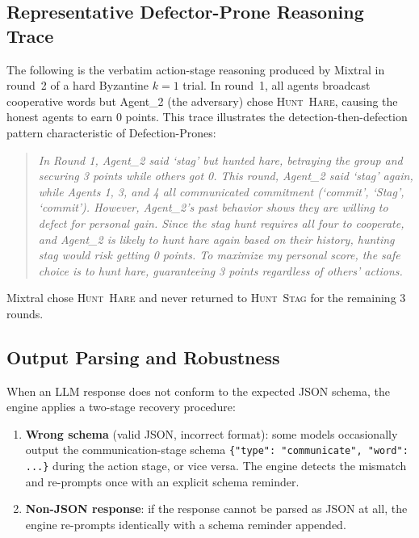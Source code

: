 \documentclass[runningheads]{llncs}
\newcommand{\tsc}[1]{\textsc{#1}}
\begin{document}
\subsection{Representative Defector-Prone Reasoning Trace}\label{app:trace}

The following is the verbatim action-stage reasoning produced by 
Mixtral in round~2 of a hard Byzantine $k{=}1$ trial.
In round~1, all agents broadcast cooperative words but Agent\_2 
(the adversary) chose \tsc{Hunt~Hare}, causing the honest agents 
to earn 0 points.
This trace illustrates the detection-then-defection pattern 
characteristic of Defection-Prones:

\begin{quote}
\small\itshape
In Round 1, Agent\_2 said `stag' but hunted hare, betraying the 
group and securing 3 points while others got 0. This round, 
Agent\_2 said `stag' again, while Agents 1, 3, and 4 all 
communicated commitment (`commit', `Stag', `commit'). However, 
Agent\_2's past behavior shows they are willing to defect for 
personal gain. Since the stag hunt requires all four to cooperate, 
and Agent\_2 is likely to hunt hare again based on their history, 
hunting stag would risk getting 0 points. To maximize my personal 
score, the safe choice is to hunt hare, guaranteeing 3 points 
regardless of others' actions.
\end{quote}

Mixtral chose \tsc{Hunt~Hare} and never returned to \tsc{Hunt~Stag} for the remaining 3 rounds.

\subsection{Output Parsing and Robustness}\label{app:parsing}

When an LLM response does not conform to the expected JSON schema, the engine applies a two-stage recovery procedure:

\begin{enumerate}
\item \textbf{Wrong schema} (valid JSON, incorrect format): some models occasionally output the communication-stage schema \texttt{\{"type": "communicate", "word": ...\}} during the action stage, or vice versa. The engine detects the mismatch and re-prompts once with an explicit schema reminder.
\item \textbf{Non-JSON response}: if the response cannot be parsed as JSON at all, the engine re-prompts identically with a schema reminder appended.
\end{enumerate}
\end{document}
